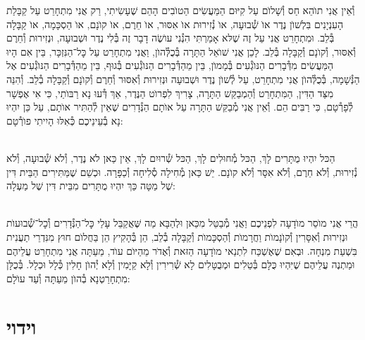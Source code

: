 \documentclass[twoside, openany, parskip=half, 11pt]{book}
\begin{document}
וְ֯אֵין אֲנִי תוׂהֵא חַס וְ֯שָׁלוׂם עַל קִיּוּם הַמַּעֲשִׂים הַטוׂבִים הָהֵם שֶׁעָשִׂיתִי, רַק אֲנִי מִתְחָרֵט עַל קַבָּלַת הָעִנְיָנִים בִּלְשׁוׂן נֶדֶר אוׂ שְׁ֯בוּעָה, אוׂ נְ֯זִירוּת אוׂ אִסּוּר, אוׂ חֵרֶם, אוׂ קוׂנָם, אוׂ הַסְכָּמָה, אוׂ קַבָּלָה בְּ֯לֵב. וּמִתְחָרֵט אֲנִי עַל זֶה שֶׁלּא אָמַרְתִּי הִנְ֯נִי עוׂשֶׂה דָבָר זֶה בְּ֯לִי נֶדֶר וּשְׁבוּעָה, וּנְזִירוּת וְ֯חֵרֶם וְ֯אִסּוּר, וְ֯קוׂנָם וְ֯קַבָּלָה בְּ֯לֵב. לָכֵן אֲנִי שׁוׂאֵל הַתָּרָה בְּ֯כֻלְּ֯הוׂן, וַאֲנִי מִתְחָרֵט עַל כׇּל־הַנִּזְכָּר, בֵּין אִם הָיוּ הַמַּעֲשִׂים מִדְּ֯בָרִים הַנּוׂגְ֯עִים בְּ֯מָמוׂן, בֵּין מֵהַדְּ֯בָרִים הַנּוׂגְ֯עִים בְּ֯גוּף, בֵּין מֵהַדְּ֯בָרִים הַנּוׂגְ֯עִים אֶל הַנְּ֯שָׁמָה, בְּ֯כֻלְּ֯הוׂן אֲנִי מִתְחָרֵט, עַל לְ֯שׁוׂן נֶדֶר וּשְׁבוּעָה וּנְזִירוּת וְ֯אִסּוּר וְ֯חֵרֶם וְ֯קוׂנָם וְ֯קַבָּלָה בְ֯לֵב. וְ֯הִנֵּה מִצַּד הַדִּין, הַמִּתְחָרֵט וְ֯הַמְבַקֵּשׁ הַתָּרָה, צָרִיךְ לִפְרוׂט הַנֶּדֶר, אַךְ דְּ֯עוּ נָא רַבּוׂתַי, כִּי אִי אֶפְשָׁר לְ֯פָרְ֯טָם, כִּי רַבִּים הֵם. וְ֯אֵין אֲנִי מְ֯בַקֵּשׁ הַתָּרָה עַל אוׂתָם הַנְּ֯דָרִים שֶׁאֵין לְ֯הַתִּיר אוׂתָם, עַל כֵּן יִהְיוּ נָא בְ֯עֵינֵיכֶם כְּ֯אִלּוּ הָיִיתִי פוׂרְ֯טָם:

\\
הַכּל יִהְיוּ מֻתָּרִים לָךְ, הַכּל מְ֯חוּלִים לָךְ, הַכּל שְׁ֯רוּיִם לָךְ, אֵין כַּאן לֺא נֶדֶר, וְ֯לֺא שְׁ֯בוּעָה, וְ֯לֺא נְ֯זִירוּת, וְ֯לֺא חֵרֶם, וְ֯לֺא אִסָּר וְ֯לֺא קוׂנָם. יֵשׁ כַּאן מְ֯חִילָה סְ֯לִיחָה וְ֯כַפָּרָה. וּכְשֵׁם שֶׁמַּתִּירִים הַבֵּית דִּין שֶׁל מַטָּה כַּךְ יִהְיוּ מֻתָּרִים מִבֵּית דִּין שֶׁל מַעְלָה:

\\
הֲרֵי אֲנִי מוֺסֵר מוׂדָעָה לִפְנֵיכֶם וַאֲנִי מְ֯בַטֵּל מִכַּאן וּלְהַבָּא מַה שֶּׁאֲקַבֵּל עָלַי כׇּל־הַנְּ֯דָרִים וְ֯כׇל־שְׁ֯בוּעוׂת וּנְזִירוּת וְ֯אִסָּרִין וְ֯קוׂנָמוׂת וַחֲרָמוׂת וְ֯הַסְכָּמוׂת וְ֯קַבָּלָה בְ֯לֵב, הֵן בְּ֯הָקִיץ הֵן בַּחֲלוׂם חוּץ מִנִּדְרֵי תַעֲנִית בִּשְׁעַת מִנְחָה. וּבְאִם שֶׁאֶשְׁכַּח לִתְנַאי מוׂדָעָה הַזּאת וְ֯אֶדּׂר מֵהַיּוׂם עוׂד, מֵעַתָּה אֲנִי מִתְחָרֵט עֲלֵיהֶם וּמַתְנֶה עֲלֵיהֶם שֶׁיִּהְיוּ כֻּלָּם בְּ֯טֵלִים וּמְבֻטָּלִים לָא שְׁ֯רִירִין וְ֯לָא קַיָּמִין וְ֯לָא יְ֯הוׂן חָלִין כְּ֯לָל וּכְלָל. בְּ֯כֻלָּן מִתְחָרַטְנָא בְ֯הוׂן מֵעַתָּה וְ֯עַד עוׂלָם:

\vfill
\sepline




\chapter[וידוי]{ וידוי }
\end{document}
